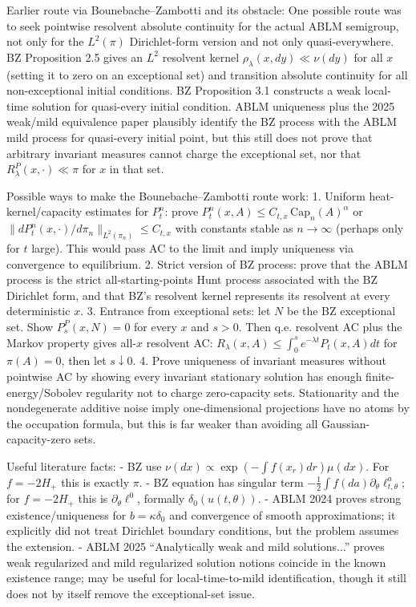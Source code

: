 \documentclass[12pt]{article}
\begin{document}
Earlier route via Bounebache--Zambotti and its obstacle:
One possible route was to seek pointwise resolvent absolute continuity for the actual ABLM
semigroup, not only for the $L^2(\pi)$ Dirichlet-form version and not
only quasi-everywhere.  BZ Proposition 2.5 gives an $L^2$ resolvent kernel
$\rho_\lambda(x,dy)\ll\nu(dy)$ for all $x$ (setting it to zero on an
exceptional set) and transition absolute continuity for all
non-exceptional initial conditions.  BZ Proposition 3.1 constructs a
weak local-time solution for quasi-every initial condition.  ABLM
uniqueness plus the 2025 weak/mild equivalence paper plausibly identify
the BZ process with the ABLM mild process for quasi-every initial point,
but this still does not prove that arbitrary invariant measures cannot
charge the exceptional set, nor that $R_\lambda^P(x,\cdot)\ll\pi$ for
$x$ in that set.

Possible ways to make the Bounebache--Zambotti route work:
1. Uniform heat-kernel/capacity estimates for $P_t^n$: prove
   $P_t^n(x,A)\le C_{t,x}\,\mathrm{Cap}_n(A)^\alpha$ or
   $\|dP_t^n(x,\cdot)/d\pi_n\|_{L^2(\pi_n)}\le C_{t,x}$ with constants
   stable as $n\to\infty$ (perhaps only for $t$ large).  This would pass
   AC to the limit and imply uniqueness via convergence to equilibrium.
2. Strict version of BZ process: prove that the ABLM process is the
   strict all-starting-points Hunt process associated with the BZ
   Dirichlet form, and that BZ's resolvent kernel represents its
   resolvent at every deterministic $x$.
3. Entrance from exceptional sets: let $N$ be the BZ exceptional set.
   Show $P_s^P(x,N)=0$ for every $x$ and $s>0$.  Then q.e. resolvent AC
   plus the Markov property gives all-$x$ resolvent AC:
   $R_\lambda(x,A)\le\int_0^s e^{-\lambda t}P_t(x,A)dt$ for
   $\pi(A)=0$, then let $s\downarrow0$.
4. Prove uniqueness of invariant measures without pointwise AC by showing
   every invariant stationary solution has enough finite-energy/Sobolev
   regularity not to charge zero-capacity sets.  Stationarity and the
   nondegenerate additive noise imply one-dimensional projections have no
   atoms by the occupation formula, but this is far weaker than avoiding
   all Gaussian-capacity-zero sets.

Useful literature facts:
- BZ use $\nu(dx)\propto \exp(-\int f(x_r)dr)\mu(dx)$.  For
  $f=-2H_+$ this is exactly $\pi$.
- BZ equation has singular term
  $-\frac12\int f(da)\partial_\theta\ell^a_{t,\theta}$; for
  $f=-2H_+$ this is $\partial_\theta\ell^0$, formally
  $\delta_0(u(t,\theta))$.
- ABLM 2024 proves strong existence/uniqueness for $b=\kappa\delta_0$
  and convergence of smooth approximations; it explicitly did not treat
  Dirichlet boundary conditions, but the problem assumes the extension.
- ABLM 2025 ``Analytically weak and mild solutions...'' proves weak
  regularized and mild regularized solution notions coincide in the
  known existence range; may be useful for local-time-to-mild
  identification, though it still does not by itself remove the
  exceptional-set issue.
\end{document}
